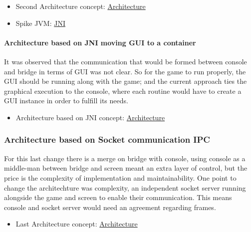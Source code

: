 \begin{itemize}
    \item Second Architecture concept: \href{https://github.com/Pending-Name-21/arquitecture/pull/5}{Architecture}
    \item Spike JVM: \href{https://tree.taiga.io/project/joseluis-teran-coffeetime/us/2?milestone=390348}{JNI}
\end{itemize}

\paragraph{Architecture based on JNI moving GUI to a container}
It was observed that the communication that would be formed between console and bridge in terms of GUI was not clear. So for the game to run properly, the GUI should be running along with the game; and the current approach ties the graphical execution to the console, where each routine would have to create a GUI instance in order to fulfill its needs.

\begin{itemize}
    \item Architecture based on JNI concept: \href{https://github.com/Pending-Name-21/arquitecture/pull/12}{Architecture}
\end{itemize}


\subsubsection{Architecture based on Socket communication IPC}
For this last change there is a merge on bridge with console, using console as a middle-man between bridge and screen meant an extra layer of control, but the price is the complexity of implementation and maintainability. One point to change the architechture was complexity,
an independent socket server running alongside the game and screen to enable their communication. This means console and socket server would need an agreement regarding frames.
\begin{itemize}
    \item Last Architecture concept: \href{https://github.com/Pending-Name-21/arquitecture/pull/17}{Architecture}
\end{itemize}